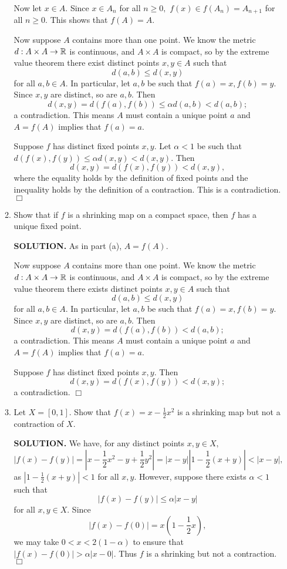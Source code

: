 \documentclass{article}
\begin{document}
\begin{enumerate}
\begin{enumerate}
        Now let $x \in A.$ Since $x \in A_n$ for all $n \geq 0,$ $f(x) \in f(A_n) = A_{n+1}$ for all $n \geq 0.$ This shows that $f(A) = A.$

        Now suppose $A$ contains more than one point. We know the metric $d: A \times A \rightarrow \mathbb{R}$ is continuous, and $A \times A$ is compact, so by the extreme value theorem there exist distinct points $x,y \in A$ such that
        $$d(a, b) \leq d(x, y)$$
        for all $a, b \in A.$ In particular, let $a, b$ be such that $f(a) = x, f(b) = y.$ Since $x, y$ are distinct, so are $a, b.$ Then 
        $$d(x, y) = d(f(a), f(b)) \leq \alpha d(a, b) < d(a, b);$$
        a contradiction. This means $A$ must contain a unique point $a$ and $A = f(A)$ implies that $f(a) = a.$
        
        Suppose $f$ has distinct fixed points $x, y.$ Let $\alpha<1$ be such that $d(f(x), f(y)) \leq \alpha d(x, y) < d(x, y).$ Then
        $$d(x, y) = d(f(x), f(y)) < d(x, y),$$
        where the equality holds by the definition of fixed points and the inequality holds by the definition of a contraction. This is a contradiction. $\Box$
        
        \item Show that if $f$ is a shrinking map on a compact space, then $f$ has a unique fixed point.

        {\bf SOLUTION.} As in part (a), $A = f(A).$

        Now suppose $A$ contains more than one point. We know the metric $d: A \times A \rightarrow \mathbb{R}$ is continuous, and $A \times A$ is compact, so by the extreme value theorem there exists distinct points $x,y \in A$ such that
        $$d(a, b) \leq d(x, y)$$
        for all $a, b \in A.$ In particular, let $a, b$ be such that $f(a) = x, f(b) = y.$ Since $x, y$ are distinct, so are $a, b.$ Then 
        $$d(x, y) = d(f(a), f(b)) < d(a, b);$$
        a contradiction. This means $A$ must contain a unique point $a$ and $A = f(A)$ implies that $f(a) = a.$
        
        Suppose $f$ has distinct fixed points $x, y.$ Then
        $$d(x, y) = d(f(x), f(y)) < d(x, y);$$
        a contradiction. $\Box$

        \item Let $X = [0, 1]$. Show that $f(x) = x - \frac12 x^2$ is a shrinking map but not a contraction of $X.$

        {\bf SOLUTION.} We have, for any distinct points $x, y \in X,$
        $$|f(x)-f(y)| = |x-\frac12 x^2 - y + \frac12 y^2| = |x-y||1-\frac12 (x+y)| < |x-y|,$$
        as $|1-\frac12(x+y)| < 1$ for all $x, y.$ However, suppose there exists $\alpha < 1$ such that
        $$|f(x)-f(y)| \leq \alpha |x-y|$$
        for all $x, y \in X.$ Since
        $$|f(x)-f(0)| = x(1-\frac12 x),$$
        we may take $0 < x < 2(1-\alpha)$ to ensure that $|f(x)-f(0)| > \alpha |x-0|.$ Thus $f$ is a shrinking but not a contraction. $\Box$


\end{enumerate}
\end{enumerate}
\end{document}
